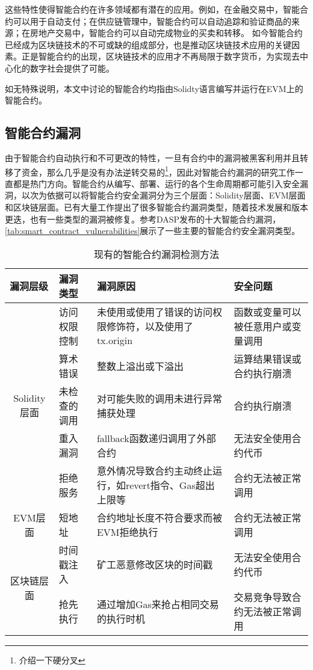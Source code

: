 这些特性使得智能合约在许多领域都有潜在的应用。例如，在金融交易中，智能合约可以用于自动支付；在供应链管理中，智能合约可以自动追踪和验证商品的来源；在房地产交易中，智能合约可以自动完成物业的买卖和转移。
如今智能合约已经成为区块链技术的不可或缺的组成部分，也是推动区块链技术应用的关键因素。正是智能合约的出现，区块链技术的应用才不再局限于数字货币，为实现去中心化的数字社会提供了可能。

如无特殊说明，本文中讨论的智能合约均指由Solidty语言编写并运行在EVM上的智能合约。
\subsection{智能合约漏洞}
\label{sec:智能合约漏洞}
由于智能合约自动执行和不可更改的特性，一旦有合约中的漏洞被黑客利用并且转移了资金，那么几乎是没有办法逆转交易的\footnote{介绍一下硬分叉}，因此对智能合约漏洞的研究工作一直都是热门方向。智能合约从编写、部署、运行的各个生命周期都可能引入安全漏洞，以次为依据可以将智能合约安全漏洞分为三个层面：Solidity层面、EVM层面和区块链层面。已有大量工作提出了很多智能合约漏洞类型，随着技术发展和版本更迭，也有一些类型的漏洞被修复。参考DASP发布的十大智能合约漏洞\cite{dasp10}，\autoref{tab:smart_contract_vulnerabilities}展示了一些主要的智能合约安全漏洞类型。
\begin{table}[htbp]
    \caption{\label{tab:smart_contract_vulnerabilities}现有的智能合约漏洞检测方法}
    \small
            \renewcommand{\arraystretch}{1.5}
        \begin{tabularx}{\linewidth}{cp{3cm}<{\centering}X<{\centering}X<{\centering}}

    \hline
    \multicolumn{1}{l}{漏洞层级}    & 漏洞类型   & 漏洞原因                              & 安全问题    \\ \hline
    \multirow{5}{*}{Solidity层面} & 访问权限控制 & 未使用或使用了错误的访问权限修饰符，以及使用了tx.origin  & 函数或变量可以被任意用户或变量调用 \\
                                & 算术错误   & 整数上溢出或下溢出                         & 运算结果错误或合约执行崩溃 \\
                                & 未检查的调用 & 对可能失败的调用未进行异常捕获处理                 & 合约执行崩溃 \\
                                & 重入漏洞   & fallback函数递归调用了外部合约               & 无法安全使用合约代币 \\
                                & 拒绝服务   & 意外情况导致合约主动终止运行，如revert指令、Gas超出上限等 & 合约无法被正常调用 \\ \hline
    EVM层面                       & 短地址    & 合约地址长度不符合要求而被EVM拒绝执行              & 合约无法被正常调用 \\ \hline
    \multirow{3}{*}{区块链层面}      & 时间戳注入  & 矿工恶意修改区块的时间戳                      & 无法安全使用合约代币 \\
                                & 抢先执行   & 通过增加Gas来抢占相同交易的执行时机             & 交易竞争导致合约无法被正常调用 \\ \hline
        \end{tabularx}
\end{table}
